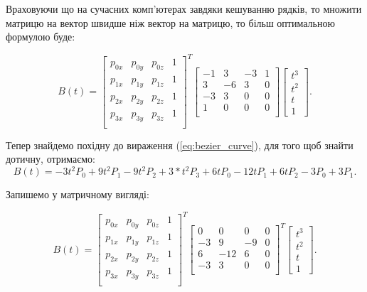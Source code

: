 \let\mypdfximage\pdfximage\def\pdfximage{\immediate\mypdfximage}\documentclass[14pt,a4paper]{extarticle}
\theoremstyle{definition}
\renewcommand{\[}{\begin{singlespace}\begin{equation*}}
\renewcommand{\]}{\end{equation*}\end{singlespace}}
\renewcommand{\+}{\discretionary{\mbox{\scriptsize$\hookleftarrow$}}{}{}}
\begin{document}
Враховуючи що на сучасних комп'ютерах завдяки кешуванню рядків, то множити матрицю на вектор швидше ніж вектор на матрицю, то більш оптимальною формулою буде: 
\[B(t)=\left[\begin{matrix}
p_{0x} & p_{0y} & p_{0z} & 1 \\
p_{1x} & p_{1y} & p_{1z} & 1 \\
p_{2x} & p_{2y} & p_{2z} & 1 \\
p_{3x} & p_{3y} & p_{3z} & 1 \\
\end{matrix}\right]^T\left[\begin{matrix}
-1 &  3 & -3 & 1 \\
 3 & -6 &  3 & 0 \\
-3 &  3 &  0 & 0 \\
 1 &  0 &  0 & 0 \\
\end{matrix}\right]\left[\begin{matrix}t^3\\t^2\\t\\1\end{matrix}\right].\]

Тепер знайдемо похідну до вираження (\ref{eq:bezier_curve}), для того щоб знайти дотичну, отримаємо:
\begin{equation}
B(t) = -3t^2P_0+9t^2P_1-9t^2P_2+3*t^2P_3 + 6tP_0-12tP_1+6tP_2 - 3P_0+3P_1.
\end{equation}

Запишемо у матричному вигляді:
\[B(t)=\left[\begin{matrix}
p_{0x} & p_{0y} & p_{0z} & 1 \\
p_{1x} & p_{1y} & p_{1z} & 1 \\
p_{2x} & p_{2y} & p_{2z} & 1 \\
p_{3x} & p_{3y} & p_{3z} & 1 \\
\end{matrix}\right]^T\left[\begin{matrix}
 0 &   0 &  0 & 0 \\
-3 &   9 & -9 & 0 \\
 6 & -12 &  6 & 0 \\
-3 &   3 &  0 & 0 \\
\end{matrix}\right]^T\left[\begin{matrix}t^3\\t^2\\t\\1\end{matrix}\right].\]
\end{document}
